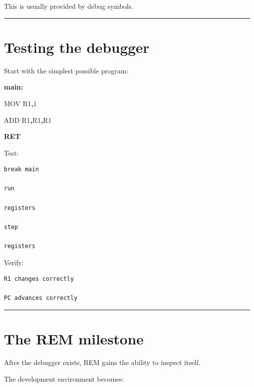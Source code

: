 \documentclass[
  oneside,
  openany]{book}
\newenvironment{Shaded}{\begin{snugshade}}{\end{snugshade}}
\newcommand{\BuiltInTok}[1]{#1}
\newcommand{\ControlFlowTok}[1]{\textcolor[rgb]{0.13,0.29,0.53}{\textbf{#1}}}
\newcommand{\DecValTok}[1]{\textcolor[rgb]{0.00,0.00,0.81}{#1}}
\newcommand{\FunctionTok}[1]{\textcolor[rgb]{0.13,0.29,0.53}{\textbf{#1}}}
\newcommand{\NormalTok}[1]{#1}
\newcommand{\OperatorTok}[1]{\textcolor[rgb]{0.81,0.36,0.00}{\textbf{#1}}}
\begin{document}
This is usually provided by debug symbols.

\begin{center}\rule{0.5\linewidth}{0.5pt}\end{center}

\hypertarget{testing-the-debugger}{%
\section{Testing the debugger}\label{testing-the-debugger}}

Start with the simplest possible program:

\begin{Shaded}
\begin{Highlighting}[]
\FunctionTok{main:}

    \BuiltInTok{MOV}\NormalTok{ R1}\OperatorTok{,}\DecValTok{1}

    \BuiltInTok{ADD}\NormalTok{ R1}\OperatorTok{,}\NormalTok{R1}\OperatorTok{,}\NormalTok{R1}

    \ControlFlowTok{RET}
\end{Highlighting}
\end{Shaded}

Test:

\begin{verbatim}
break main

run

registers

step

registers
\end{verbatim}

Verify:

\begin{verbatim}
R1 changes correctly

PC advances correctly
\end{verbatim}

\begin{center}\rule{0.5\linewidth}{0.5pt}\end{center}

\hypertarget{the-rem-milestone}{%
\section{The REM milestone}\label{the-rem-milestone}}

After the debugger exists, REM gains the ability to inspect itself.

The development environment becomes:
\end{document}
